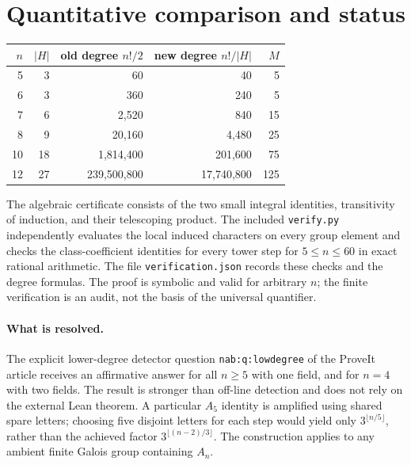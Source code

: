 \documentclass[11pt]{article}
\theoremstyle{remark}\newtheorem{remark}[theorem]{Remark}
\newcommand{\source}{\texttt{nab:q:lowdegree}}
\begin{document}
\section{Quantitative comparison and status}
\begin{center}
\begin{tabular}{rrrrr}
\toprule
$n$&$|H|$&old degree $n!/2$&new degree $n!/|H|$&$M$\\\midrule
5&3&60&40&5\\
6&3&360&240&5\\
7&6&2,520&840&15\\
8&9&20,160&4,480&25\\
10&18&1,814,400&201,600&75\\
12&27&239,500,800&17,740,800&125\\
\bottomrule
\end{tabular}
\end{center}
The algebraic certificate consists of the two small integral identities,
transitivity of induction, and their telescoping product. The included
\texttt{verify.py} independently evaluates the local induced characters on every
group element and checks the class-coefficient identities for every tower step
for $5\le n\le60$ in exact rational arithmetic. The file
\texttt{verification.json} records these checks and the degree formulas. The
proof is symbolic and valid for arbitrary $n$; the finite verification is an
audit, not the basis of the universal quantifier.

\paragraph{What is resolved.} The explicit lower-degree detector question
\source{} of the ProveIt article receives an affirmative answer for all
$n\ge5$ with one field, and for $n=4$ with two fields. The result is stronger
than off-line detection and does not rely on the external Lean theorem. A
particular $A_5$ identity is amplified using shared spare letters; choosing
five disjoint letters for each step would yield only $3^{\lfloor n/5\rfloor}$,
rather than the achieved factor $3^{\lfloor(n-2)/3\rfloor}$. The construction
applies to any ambient finite Galois group containing $A_n$.
\end{document}
